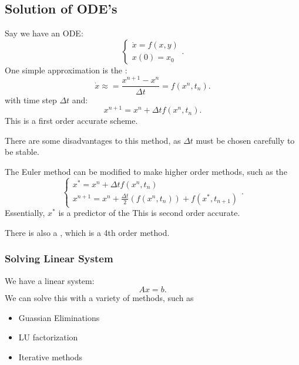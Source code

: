 \documentclass[../main/main.tex]{subfiles}
\begin{document}
 \subsection{Solution of ODE's}
 Say we have an ODE: \[
 \begin{cases}
     \dot{x}=f(x,y)\\
     x(0) = x_0
 \end{cases}
 .\] 
 One simple approximation is the : \[
     \dot{x} \approx = \frac{x^{n+1}-x^{n}}{\Delta t} = f(x^{n},t_n)
 .\] 
 with time step $\Delta t$ and:  \[
     x^{n+1} = x^{n} + \Delta t f(x^{n}, t_n)
 .\] 
 This is a first order accurate scheme.
 \begin{remark}
    There are some disadvantages to this method, as $\Delta t$ must be chosen carefully to be stable. 
 \end{remark}
 The Euler method can be modified to make higher order methods, such as the 
 \[
 \begin{cases}
     x^{*} = x^{n} + \Delta t f(x^{n},t_n)\\
     x^{n+1} = x^{n} + \frac{\Delta t}{2}\left( f(x^{n},t_n) \right) +f(x^{*},t_{n+1})
 \end{cases}
 .\] 
 Essentially, $x^{*}$ is a predictor of the 
 This is second order accurate.
 \begin{remark} 
     There is also a , which is a 4th order method.
 \end{remark}
 
 
 \subsubsection{Solving Linear System}
We have a linear system: \[
Ax=b
.\] 
We can solve this with a variety of methods, such as 
\begin{itemize}
    \item Guassian Eliminations
    \item LU factorization
    \item Iterative methods
\end{itemize}
\end{document}
